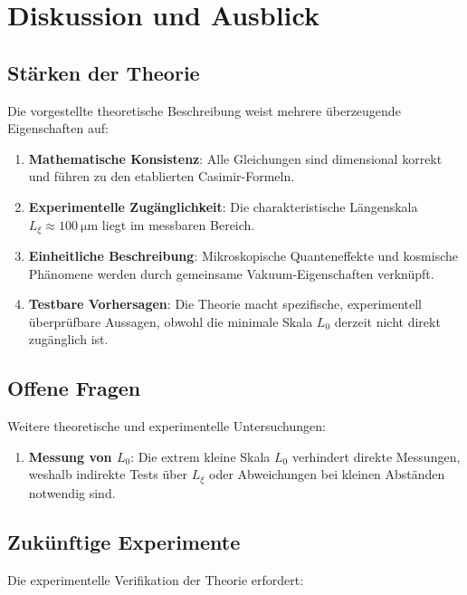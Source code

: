 \documentclass[12pt,a4paper]{article}
\begin{document}
	\section{Diskussion und Ausblick}
	
	\subsection{Stärken der Theorie}
	
	Die vorgestellte theoretische Beschreibung weist mehrere überzeugende Eigenschaften auf:
	
	\begin{enumerate}
		\item \textbf{Mathematische Konsistenz}: Alle Gleichungen sind dimensional korrekt und führen zu den etablierten Casimir-Formeln.
		\item \textbf{Experimentelle Zugänglichkeit}: Die charakteristische Längenskala \( L_\xi \approx \SI{100}{\micro\meter} \) liegt im messbaren Bereich.
		\item \textbf{Einheitliche Beschreibung}: Mikroskopische Quanteneffekte und kosmische Phänomene werden durch gemeinsame Vakuum-Eigenschaften verknüpft.
		\item \textbf{Testbare Vorhersagen}: Die Theorie macht spezifische, experimentell überprüfbare Aussagen, obwohl die minimale Skala \( L_0 \) derzeit nicht direkt zugänglich ist.
	\end{enumerate}
	
	\subsection{Offene Fragen}
	
	Weitere theoretische und experimentelle Untersuchungen:
	
	\begin{enumerate}
		\item \textbf{Messung von \( L_0 \)}: Die extrem kleine Skala \( L_0 \) verhindert direkte Messungen, weshalb indirekte Tests über \( L_\xi \) oder Abweichungen bei kleinen Abständen notwendig sind.
	\end{enumerate}
	
	\subsection{Zukünftige Experimente}
	
	Die experimentelle Verifikation der Theorie erfordert:
	
\end{document}
